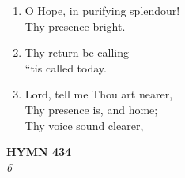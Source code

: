 \documentclass[11pt,a4paper]{article}
\begin{document}
\begin{enumerate}
    \item O Hope, in purifying splendour! \\
        Thy presence bright.

    \item Thy return be calling \\
        ``tis called today.

    \item Lord, tell me Thou art nearer, \\
        Thy presence is, and home; \\
        Thy voice sound clearer,

\end{enumerate}

\newpage
\begin{center}
    {\Large \textbf{HYMN 434}}
    \\
    \textit{6}
\end{center}
\vspace{1em}
\end{document}

